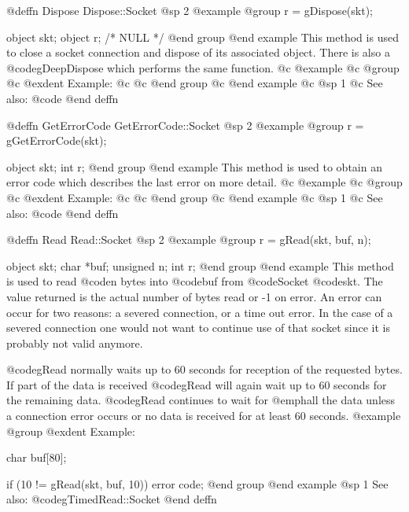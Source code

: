 @deffn {Dispose} Dispose::Socket
@sp 2
@example
@group
r = gDispose(skt);

object  skt;
object  r;     /*  NULL  */
@end group
@end example
This method is used to close a socket connection and dispose of its
associated object.  There is also a @code{gDeepDispose} which performs the
same function.
@c @example
@c @group
@c @exdent Example:
@c 
@c @end group
@c @end example
@c @sp 1
@c See also:  @code{}
@end deffn















@deffn {GetErrorCode} GetErrorCode::Socket
@sp 2
@example
@group
r = gGetErrorCode(skt);

object  skt;
int     r;
@end group
@end example
This method is used to obtain an error code which describes the last
error on more detail.
@c @example
@c @group
@c @exdent Example:
@c 
@c @end group
@c @end example
@c @sp 1
@c See also:  @code{}
@end deffn












@deffn {Read} Read::Socket
@sp 2
@example
@group
r = gRead(skt, buf, n);

object   skt;
char     *buf;
unsigned n;
int      r;
@end group
@end example
This method is used to read @code{n} bytes into @code{buf} from
@code{Socket} @code{skt}.  The value returned is the actual number
of bytes read or -1 on error.  An error can occur for two reasons:
a severed connection, or a time out error.  In the case of a severed
connection one would not want to continue use of that socket since
it is probably not valid anymore.

@code{gRead} normally waits up to 60 seconds for reception of the
requested bytes.  If part of the data is received @code{gRead}
will again wait up to 60 seconds for the remaining data.  @code{gRead}
continues to wait for @emph{all} the data unless a connection error
occurs or no data is received for at least 60 seconds.
@example
@group
@exdent Example:
 
char    buf[80];

if (10 != gRead(skt, buf, 10))
        error code;
@end group
@end example
@sp 1
See also:  @code{gTimedRead::Socket}
@end deffn
















